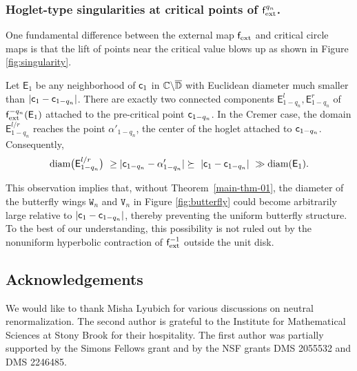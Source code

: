 \documentclass{amsart}
\begin{document}
\subsubsection{Hoglet-type singularities at critical points of $\mathsf{f}_{\textnormal{ext}}^{q_n}$.}\label{sss:hoglet.singul} 
One fundamental difference between the external map $\mathsf{f}_{\textnormal{ext}}$ and critical circle maps is that the lift of points near the critical value blows up as shown in Figure \ref{fig:singularity}.

Let $\mathsf{E}_1$ be any neighborhood of $\mathsf{c}_1$ in $\mathbb{C} \backslash \overline{\mathbb{D}}$ with Euclidean diameter much smaller than $|\mathsf{c}_1 - \mathsf{c}_{1-q_n}|$.
There are exactly two connected components $\mathsf{E}^l_{1-q_n}, \mathsf{E}^r_{1-q_n}$ of $\mathsf{f}_{\textnormal{ext}}^{-q_n}(\mathsf{E}_1)$ attached to the pre-critical point $\mathsf{c}_{1-q_n}$. 
In the Cremer case, the domain $\mathsf{E}^{l/r}_{1-q_n}$ reaches the point $\alpha'_{1-q_n}$, the center of the hoglet attached to $\mathsf{c}_{1-q_n}$.
Consequently,
\begin{equation}
\label{eq:E1.blowup}
\textnormal{diam} \big(\mathsf{E}^{l/r}_{1-q_n} \big)\ \ge |\mathsf{c}_{1-q_n} - \alpha'_{1-q_n}| \succeq\ |\mathsf{c}_1 - \mathsf{c}_{1-q_n}|\ \gg \textnormal{diam} (\mathsf{E}_1).    
\end{equation}


This observation implies that, without Theorem~\ref{main-thm-01}, the diameter of the butterfly wings $\mathtt{W}_n$ and $\mathtt{V}_n$ in Figure \ref{fig:butterfly} could become arbitrarily large relative to $|\mathsf{c}_1 - \mathsf{c}_{1-q_n}|$, thereby preventing the uniform butterfly structure. To the best of our understanding, this possibility is not ruled out by the nonuniform hyperbolic contraction of $\mathsf{f}_{\textnormal{ext}}^{-1}$ outside the unit disk.




\subsection{Acknowledgements}

We would like to thank Misha Lyubich for various discussions on neutral renormalization.
The second author is grateful to the Institute for Mathematical
Sciences at Stony Brook for their hospitality. The first author was partially supported by the Simons Fellows grant and by the NSF grants DMS 2055532 and DMS 2246485.


\end{document}
